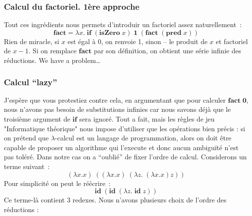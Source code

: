 \documentclass[12pt, a4paper]{article}
\newcommand{\id}{\mathbf{id}}
\begin{document}
\subsubsection*{Calcul du factoriel. 1ère approche}
Tout ces ingrédients nous permets d'introduir un factoriel assez naturellement~:
$$\mathbf{fact} = \lambda x. \; \mathbf{if} \; (\mathbf{isZero} \; x) \; \mathbf{1} \; (\mathbf{fact} \; (\mathbf{pred} \; x))$$
Rien de miracle, si $x$ est égal à 0, on renvoie 1, sinon -- le produit de $x$ et factoriel de $x-1$.
Si on remplace $\mathbf{fact}$ par son définition, on obtient une série infinie des réductions. We have a problem\ldots

\subsubsection*{Calcul ``lazy''}
J'espère que vous protestiez contre cela, en argumentant que pour calculer $\mathbf{fact\;0}$, nous n'avons pas besoin de substitutions infinies car nous savons déjà que le troisième argument de $\mathbf{if}$ sera ignoré.
Tout a fait, mais les règles de jeu "Informatique théorique" nous impose d'utiliser que les opérations bien précis : si on prétend que $\lambda$-calcul est un langage de programmation, alors on doit être capable de proposer un algorithme qui l'execute et donc aucun ambiguïté n'est pas toléré.
Dans notre cas on a ``oublié'' de fixer l'ordre de calcul.
Considerons un terme suivant~:
$$(\lambda x.x) \; ((\lambda x.x) \; (\lambda z. \; (\lambda x.x) z))$$
Pour simplicité on peut le réécrire~:
$$\id \; (\id \; (\lambda z. \; \id \; z))$$
Ce terme-là contient 3 redexes. Nous n'avons plusieurs choix de l'ordre des réductions :
\end{document}
